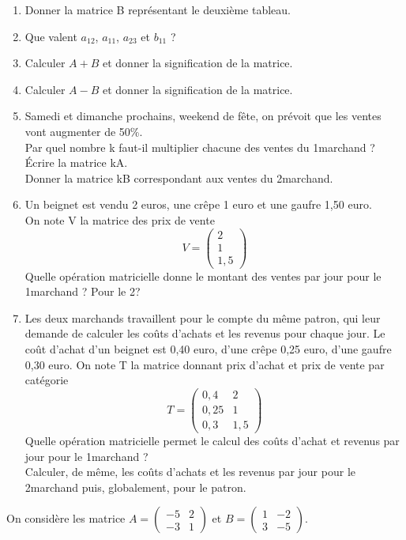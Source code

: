 \documentclass[a4paper,10pt]{article}
\begin{document}
\begin{enumerate}[\bfseries 1.]
	\item 	Donner la matrice B représentant le deuxième tableau.
	\item 	Que valent $a_{12}$, $a_{11}$, $a_{23}$ et $b_{11}$ ?
	\item 	Calculer $A+B$ et donner la signification de la matrice.
	\item 	Calculer $A-B$ et donner la signification de la matrice.
	\item  	Samedi et dimanche prochains, weekend de fête, on prévoit que les ventes vont augmenter de 50\%.\\ 
			Par quel nombre k faut-il multiplier chacune des ventes du 1\er marchand ? \'Ecrire la matrice  kA.\\
			Donner la matrice kB correspondant aux ventes du 2\eme marchand.
	\item 	Un beignet est vendu 2 euros, une crêpe 1 euro et une gaufre 1,50 euro.\\
			On note V la matrice des prix de vente
			$$V=\begin{pmatrix}
			2\\
			1\\
			1,5
			\end{pmatrix}$$
			Quelle opération matricielle donne le montant des ventes par jour pour le 1\er marchand ? Pour le 2\eme ?
	\item 	 Les deux marchands travaillent pour le compte du même patron, qui leur demande	de calculer les coûts d’achats et les revenus pour chaque jour. Le coût d’achat d’un
			beignet est 0,40 euro, d’une crêpe 0,25 euro, d’une gaufre 0,30 euro. On note T la matrice donnant prix d’achat et prix de vente par catégorie
			$$T=\begin{pmatrix}
						0,4 & 2\\
						0,25 & 1\\
						0,3 & 1,5
						\end{pmatrix}$$
			Quelle opération matricielle permet le calcul des coûts d’achat et revenus par jour
			pour le 1\er marchand ?\\
			Calculer, de même, les coûts d’achats et les revenus par jour pour le 2\eme marchand
			puis, globalement, pour le patron.			
\end{enumerate}


On considère les matrice $A=\begin{pmatrix}
-5&2\\
-3&1
\end{pmatrix}$ et $B=\begin{pmatrix}
1&-2\\
3&-5
\end{pmatrix}$.
\end{document}

